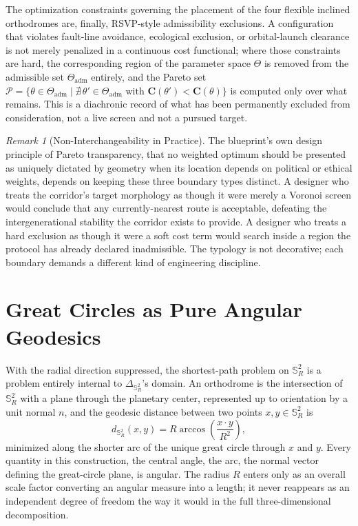 \documentclass[11pt,fleqn]{book}
\numberwithin{equation}{chapter}
\theoremstyle{plain}
\theoremstyle{definition}
\theoremstyle{remark}
\newtheorem{remark}[theorem]{Remark}
\newcommand{\Sphere}{\mathbb{S}^{2}}
\begin{document}
The optimization constraints governing the placement of the four flexible inclined orthodromes are, finally, RSVP-style admissibility exclusions. A configuration that violates fault-line avoidance, ecological exclusion, or orbital-launch clearance is not merely penalized in a continuous cost functional; where those constraints are hard, the corresponding region of the parameter space \(\Theta\) is removed from the admissible set \(\Theta_{\mathrm{adm}}\) entirely, and the Pareto set \(\mathcal P=\{\theta\in\Theta_{\mathrm{adm}}\mid \nexists\,\theta'\in\Theta_{\mathrm{adm}}\text{ with }\mathbf C(\theta')<\mathbf C(\theta)\}\) is computed only over what remains. This is a diachronic record of what has been permanently excluded from consideration, not a live screen and not a pursued target.

\begin{remark}[Non-Interchangeability in Practice]
The blueprint's own design principle of Pareto transparency, that no weighted optimum should be presented as uniquely dictated by geometry when its location depends on political or ethical weights, depends on keeping these three boundary types distinct. A designer who treats the corridor's target morphology as though it were merely a Voronoi screen would conclude that any currently-nearest route is acceptable, defeating the intergenerational stability the corridor exists to provide. A designer who treats a hard exclusion as though it were a soft cost term would search inside a region the protocol has already declared inadmissible. The typology is not decorative; each boundary demands a different kind of engineering discipline.
\end{remark}

\section{Great Circles as Pure Angular Geodesics}

With the radial direction suppressed, the shortest-path problem on \(\Sphere_R\) is a problem entirely internal to \(\Delta_{\Sphere_R}\)'s domain. An orthodrome is the intersection of \(\Sphere_R\) with a plane through the planetary center, represented up to orientation by a unit normal \(n\), and the geodesic distance between two points \(x,y\in\Sphere_R\) is
\begin{equation}
d_{\Sphere_R}(x,y)=R\arccos\!\left(\frac{x\cdot y}{R^2}\right),
\end{equation}
minimized along the shorter arc of the unique great circle through \(x\) and \(y\). Every quantity in this construction, the central angle, the arc, the normal vector defining the great-circle plane, is angular. The radius \(R\) enters only as an overall scale factor converting an angular measure into a length; it never reappears as an independent degree of freedom the way it would in the full three-dimensional decomposition.
\end{document}
